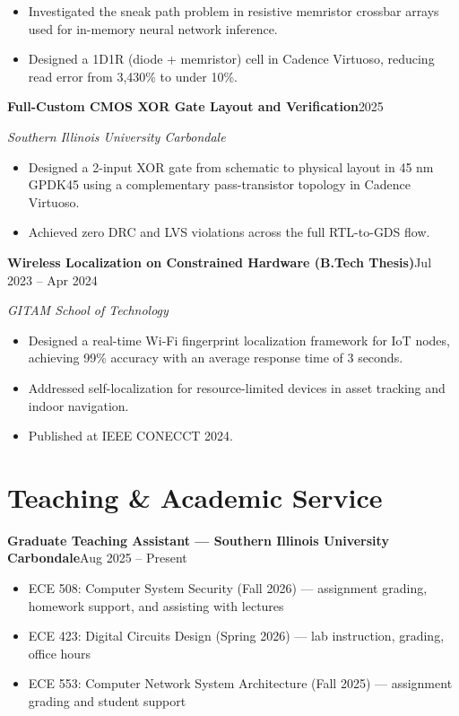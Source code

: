 \documentclass[10.5pt,letterpaper]{article}
\newcommand{\entry}[2]{\textbf{#1}\hfill #2\par\nopagebreak}
\newcommand{\subentry}[2]{\textit{#1}\hfill \textit{#2}\par\nopagebreak\vspace{0.15em}\nopagebreak}
\begin{document}
\begin{itemize}
  \item Investigated the sneak path problem in resistive memristor crossbar arrays used for in-memory
        neural network inference.
  \item Designed a 1D1R (diode + memristor) cell in Cadence Virtuoso, reducing read error from 3,430\%
        to under 10\%.
\end{itemize}
\vspace{0.25em}
\entry{Full-Custom CMOS XOR Gate Layout and Verification}{2025}
\subentry{Southern Illinois University Carbondale}{}
\begin{itemize}
  \item Designed a 2-input XOR gate from schematic to physical layout in 45 nm GPDK45 using a
        complementary pass-transistor topology in Cadence Virtuoso.
  \item Achieved zero DRC and LVS violations across the full RTL-to-GDS flow.
\end{itemize}
\vspace{0.25em}
\entry{Wireless Localization on Constrained Hardware (B.Tech Thesis)}{Jul 2023 -- Apr 2024}
\subentry{GITAM School of Technology}{}
\begin{itemize}
  \item Designed a real-time Wi-Fi fingerprint localization framework for IoT nodes, achieving 99\%
        accuracy with an average response time of 3 seconds.
  \item Addressed self-localization for resource-limited devices in asset tracking and indoor
        navigation.
  \item Published at IEEE CONECCT 2024.
\end{itemize}

\section*{Teaching \& Academic Service}
\entry{Graduate Teaching Assistant --- Southern Illinois University Carbondale}{Aug 2025 -- Present}
\begin{itemize}
  \item ECE 508: Computer System Security (Fall 2026) --- assignment grading, homework support,
        and assisting with lectures
  \item ECE 423: Digital Circuits Design (Spring 2026) --- lab instruction, grading, office hours
  \item ECE 553: Computer Network System Architecture (Fall 2025) --- assignment grading and student support
\end{itemize}
\end{document}

